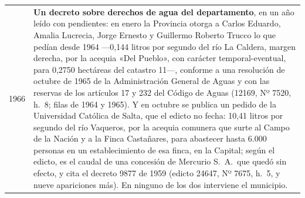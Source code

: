 \begin{longtable}{@{}p{2.7cm}p{10.3cm}@{}}
1966 & \textbf{Un decreto sobre derechos de agua del departamento}, en un año leído con pendientes: en enero la Provincia otorga a Carlos Eduardo, Amalia Lucrecia, Jorge Ernesto y Guillermo Roberto Trucco lo que pedían desde 1964 ---0,144 litros por segundo del río La Caldera, margen derecha, por la acequia «Del Pueblo», con carácter temporal-eventual, para 0,2750 hectáreas del catastro 11---, conforme a una resolución de octubre de 1965 de la Administración General de Aguas y con las reservas de los artículos 17 y 232 del Código de Aguas (12169, Nº 7520, h.\ 8; filas de 1964 y 1965). Y en octubre se publica un pedido de la Universidad Católica de Salta, que el edicto no fecha: 10,41 litros por segundo del río Vaqueros, por la acequia comunera que surte al Campo de la Nación y a la Finca Castañares, para abastecer hasta 6.000 personas en un establecimiento de esa finca, en la Capital; según el edicto, es el caudal de una concesión de Mercurio S.\ A.\ que quedó sin efecto, y cita el decreto 9877 de 1959 (edicto 24647, Nº 7675, h.\ 5, y nueve apariciones más). En ninguno de los dos interviene el municipio. \\

\end{longtable}
